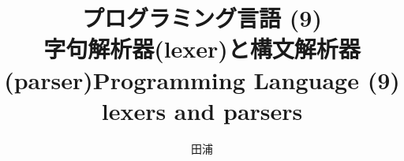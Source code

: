 \documentclass[12pt,dvipdfmx]{beamer}
\title{プログラミング言語 (9)
  \\ 字句解析器(lexer)と構文解析器(parser)}
\title{Programming Language (9)
  \\ lexers and parsers}
\institute{}
\author{田浦}
\date{}
\newif\ifja
\newcommand{\ao}[1]{{\color{blue}#1}}
\begin{document}
\maketitle


\ifja
\begin{frame}
\frametitle{はじめに}
\begin{itemize}
\item あらゆるプログラミング言語処理系は，
  最初にプログラムを読み込み，文法のチェックを行う
  \begin{itemize}
  \item 字句解析器(\ao{\it ``lexer''}または\ao{\it ``tokenizer''})
  \item 構文解析器(\ao{\it ``parser''})
  \end{itemize}
\item それらは，「言語処理系」でなくてもあらゆる場面で必要
  \begin{itemize}
  \item Web Page (HTMLやXML)の読み込み
  \item CSV, SVG, \ldots ファイル\ldots
  \item ソフトのconfig file\ldots
  \end{itemize}
\item それらを「さっと作れる」ことは実践的にも重要なスキル
  \begin{itemize}
  \item アドホックに文字列処理をやるだけではきっとうまく行かない
  \item そのための便利なツール(生成器)がある
  \item 一度使っておいて損はない!
  \end{itemize}
\end{itemize}
\end{frame}
\fi
\end{document}
